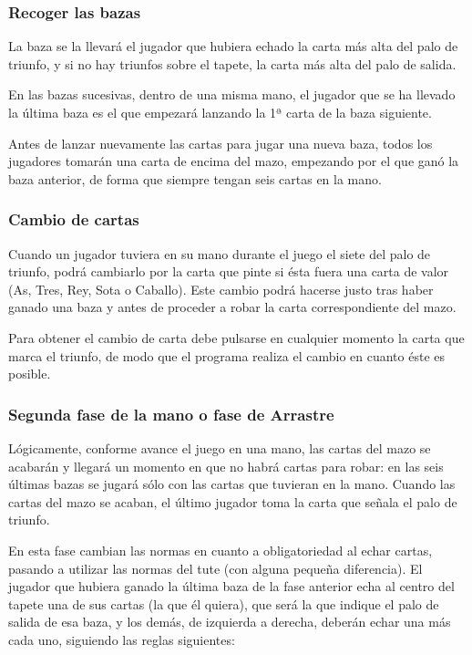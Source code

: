 \documentclass{article}
\begin{document}
\subsubsection*{Recoger las bazas}

La baza se la llevará el jugador que hubiera echado la carta más alta del palo de triunfo, y si no hay triunfos sobre el tapete, la carta más alta del palo de salida.

En las bazas sucesivas, dentro de una misma mano, el jugador que se ha llevado la última baza es el que empezará lanzando la 1ª carta de la baza siguiente.

Antes de lanzar nuevamente las cartas para jugar una nueva baza, todos los jugadores tomarán una carta de encima del mazo, empezando por el que ganó la baza anterior, de forma que siempre tengan seis cartas en la mano.

\subsubsection*{Cambio de cartas}

Cuando un jugador tuviera en su mano durante el juego el siete del palo de triunfo, podrá cambiarlo por la carta que pinte si ésta fuera una carta de valor (As, Tres, Rey, Sota o Caballo). Este cambio podrá hacerse justo tras haber ganado una baza y antes de proceder a robar la carta correspondiente del mazo.

Para obtener el cambio de carta debe pulsarse en cualquier momento la carta que marca el triunfo, de modo que el programa realiza el cambio en cuanto éste es posible.

\subsubsection*{Segunda fase de la mano o fase de Arrastre}

Lógicamente, conforme avance el juego en una mano, las cartas del mazo se acabarán y llegará un momento en que no habrá cartas para robar: en las seis últimas bazas se jugará sólo con las cartas que tuvieran en la mano. Cuando las cartas del mazo se acaban, el último jugador toma la carta que señala el palo de triunfo.

En esta fase cambian las normas en cuanto a obligatoriedad al echar cartas, pasando a utilizar las normas del tute (con alguna pequeña diferencia). El jugador que hubiera ganado la última baza de la fase anterior echa al centro del tapete una de sus cartas (la que él quiera), que será la que indique el palo de salida de esa baza, y los demás, de izquierda a derecha, deberán echar una más cada uno, siguiendo las reglas siguientes:
\end{document}
